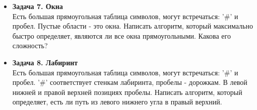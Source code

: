 \documentclass{article}
\begin{document}
\begin{itemize}
\item \textbf{Задача 7. Окна} \\
Есть большая прямоугольная таблица символов, могут встречаться: '\#' и пробел. 
Пустые области - это окна. Написать алгоритм, который максимально быстро определяет, являются ли все окна прямоугольными. Какова его сложность? 

\item \textbf{Задача 8. Лабиринт} \\
Есть большая прямоугольная таблица символов, могут встречаться: '\#' и пробел. '\#' соответствует стенкам лабиринта, пробелы - дорожкам. В левой нижней и правой верхней позициях пробелы.
Написать алгоритм, который определяет, есть ли путь из левого нижнего угла в правый верхний.
\end{itemize}
\end{document}
